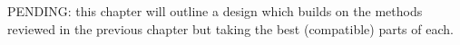 \documentclass[../main.tex]{subfiles}
\begin{document}
PENDING: this chapter will outline a design which builds on the methods reviewed in the previous chapter but taking the best (compatible) parts of each.
\end{document}
